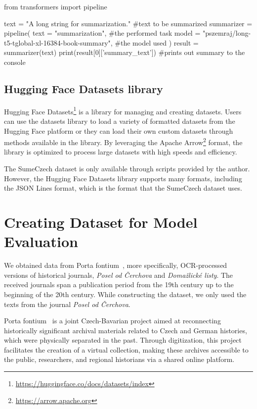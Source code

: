 \documentclass[english, ba, kiv, he, iso690numb, pdf, viewonly]{fasthesis}
\begin{document}

\begin{pythoncode}[language=Python, caption={Text summarization inference example using pipeline\label{hf:pipeline_example}}] 
from transformers import pipeline

text = "A long string for summarization." #text to be summarized
summarizer = pipeline(
    text = "summarization", #the performed task 
    model = "pszemraj/long-t5-tglobal-xl-16384-book-summary", #the model used
)
result = summarizer(text)
print(result[0]['summary_text']) #prints out summary to the console
\end{pythoncode}

\subsection{Hugging Face Datasets library}
Hugging Face Datasets\footnote{\url{https://huggingface.co/docs/datasets/index}} is a library for managing and creating datasets. Users can use the datasets library to load a variety of formatted datasets from the Hugging Face platform or they can load their own custom datasets through methods available in the library. By leveraging the Apache Arrow\footnote{\url{https://arrow.apache.org}} format, the library is optimized to process large datasets with high speeds and efficiency.

The SumeCzech dataset is only available through scripts provided by the author. However, the Hugging Face Datasets library supports many formats, including the JSON Lines format, which is the format that the SumeCzech dataset uses. 

\section{Creating Dataset for Model Evaluation} \label{impl:dataset}
We obtained data from Porta fontium~\cite{statni-oblastni-archiv-v-plzni-no-date}, more specifically, OCR-processed versions of historical journals, \textit{Posel od Čerchova} and \textit{Domažlické listy}. The received journals span a publication period from the 19th century up to the beginning of the 20th century. While constructing the dataset, we only used the texts from the journal \textit{Posel od Čerchova}.

Porta fontium~\cite{statni-oblastni-archiv-v-plzni-no-date} is a joint Czech-Bavarian project aimed at reconnecting historically significant archival materials related to Czech and German histories, which were physically separated in the past. Through digitization, this project facilitates the creation of a virtual collection, making these archives accessible to the public, researchers, and regional historians via a shared online platform.
\end{document}
